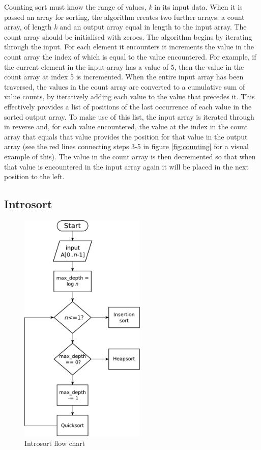 \documentclass[12pt, a4paper]{article}
\begin{document}
Counting sort must know the range of values, \emph{k} in its input data. When it is passed an array for sorting, the algorithm creates two further arrays: a count array, of length \emph{k} and an output array equal in length to the input array. The count array should be initialised with zeroes. The algorithm begins by iterating through the input. For each element it encounters it increments the value in the count array the index of which is equal to the value encountered. For example, if the current element in the input array has a value of 5, then the value in the count array at index 5 is incremented. When the entire input array has been traversed, the values in the count array are converted to a cumulative sum of value counts, by iteratively adding each value to the value that precedes it. This effectively provides a list of positions of the last occurrence of each value in the sorted output array. To make use of this list, the input array is iterated through in reverse and, for each value encountered, the value at the index in the count array that equals that value provides the position for that value in the output array (see the red lines connecting steps 3-5 in figure \ref{fig:counting} for a visual example of this). The value in the count array is then decremented so that when that value is encountered in the input array again it will be placed in the next position to the left.



\subsection{Introsort}\label{sec:introsort}

\begin{figure}
    \centering
    \includegraphics[width=6cm]{introsort.pdf}
    \caption{\label{fig:introsort}Introsort flow chart}
\end{figure}
\end{document}
